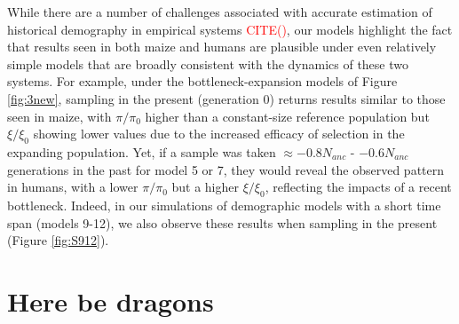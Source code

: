 \documentclass[9pt,twocolumn,twoside]{rilabRxiv}
\newcommand{\citex}[1]{{\small \textcolor{red}{CITE(#1)}}}
\begin{document}
While there are a number of challenges associated with accurate estimation of historical demography in empirical systems \citex{}, our models highlight the fact that results seen in both maize and humans are plausible under even relatively simple models that are broadly consistent with the dynamics of these two systems.
For example, under the bottleneck-expansion models of Figure \ref{fig:3new}, sampling in the present (generation 0) returns results similar to those seen in maize, with $\pi/\pi_0$ higher than a constant-size reference population but $\xi/\xi_0$ showing lower values due to the increased efficacy of selection in the expanding population.
Yet, if a sample was taken $\approx -0.8N_{anc}$ - $-0.6N_{anc}$ generations in the past for model 5 or 7, they would reveal the observed pattern in humans, with a lower $\pi/\pi_0$ but a higher $\xi/\xi_0$, reflecting the impacts of a recent bottleneck. Indeed, in our simulations of demographic models with a short time span (models 9-12), we also observe these results when sampling in the present (Figure \ref{fig:S912}).



\section{Here be dragons}

\end{document}
